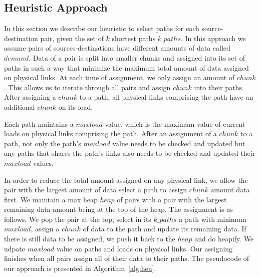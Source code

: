 \subsection{Heuristic Approach}
\label{sec:heuristic}

In this section we describe our heuristic to select paths for each source-destination pair, given the set of $k$ shortest paths $k\_paths$. In this approach we assume pairs of sources-destinations have different amounts of data called $demand$. Data of a pair is split into smaller chunks and assigned into its set of paths in such a way that minimize the maximum total amount of data assigned on physical links. At each time of assignment, we only assign an amount of $chunk$. This allows us to iterate through all pairs and assign $chunk$ into their paths. After assigning a $chunk$ to a path, all physical links comprising the path have an additional $chunk$ on its load.

Each path maintains a $maxload$ value, which is the maximum value of current loads on physical links comprising the path. After an assignment of a $chunk$ to a path, not only the path's $maxload$ value needs to be checked and updated but any paths that shares the path's links also needs to be checked and updated their $maxload$ values.

In order to reduce the total amount assigned on any physical link, we allow the pair with the largest amount of data select a path to assign $chunk$ amount data first. We maintain a max heap $heap$ of pairs with a pair with the largest remaining data amount being at the top of the heap. The assignment is as follows. We pop the pair at the top, select in its $k\_paths$ a path with minimum $maxload$, assign a $chunk$ of data to the path and update its remaining data. If there is still data to be assigned, we push it back to the $heap$ and do heapify. We udpate $maxload$ value on paths and loads on physical links. Our assigning finishes when all pairs assign all of their data to their paths. The pseudocode of our approach is presented in Algorithm~\ref{alg:heu}. 

